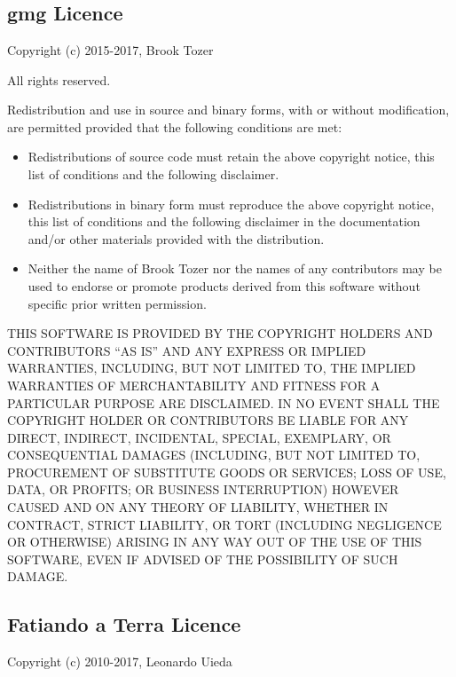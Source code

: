 \documentclass[a4paper,12pt,english]{sphinxmanual}
\begin{document}
\chapter{}
\label{\detokenize{licence::doc}}\label{\detokenize{licence:licencing}}\label{\detokenize{licence:licence}}

\section{gmg Licence}
\label{\detokenize{licence:gmg-licence}}
Copyright (c) 2015-2017, Brook Tozer

All rights reserved.

Redistribution and use in source and binary forms, with or without modification,
are permitted provided that the following conditions are met:
\begin{itemize}
\item {} 
Redistributions of source code must retain the above copyright notice,
this list of conditions and the following disclaimer.

\item {} 
Redistributions in binary form must reproduce the above copyright notice,
this list of conditions and the following disclaimer in the documentation
and/or other materials provided with the distribution.

\item {} 
Neither the name of Brook Tozer nor the names of any contributors
may be used to endorse or promote products derived from this software
without specific prior written permission.

\end{itemize}

THIS SOFTWARE IS PROVIDED BY THE COPYRIGHT HOLDERS AND CONTRIBUTORS “AS IS” AND
ANY EXPRESS OR IMPLIED WARRANTIES, INCLUDING, BUT NOT LIMITED TO, THE IMPLIED
WARRANTIES OF MERCHANTABILITY AND FITNESS FOR A PARTICULAR PURPOSE ARE
DISCLAIMED. IN NO EVENT SHALL THE COPYRIGHT HOLDER OR CONTRIBUTORS BE LIABLE FOR
ANY DIRECT, INDIRECT, INCIDENTAL, SPECIAL, EXEMPLARY, OR CONSEQUENTIAL DAMAGES
(INCLUDING, BUT NOT LIMITED TO, PROCUREMENT OF SUBSTITUTE GOODS OR SERVICES;
LOSS OF USE, DATA, OR PROFITS; OR BUSINESS INTERRUPTION) HOWEVER CAUSED AND ON
ANY THEORY OF LIABILITY, WHETHER IN CONTRACT, STRICT LIABILITY, OR TORT
(INCLUDING NEGLIGENCE OR OTHERWISE) ARISING IN ANY WAY OUT OF THE USE OF THIS
SOFTWARE, EVEN IF ADVISED OF THE POSSIBILITY OF SUCH DAMAGE.


\section{Fatiando a Terra Licence}
\label{\detokenize{licence:fatiando-a-terra-licence}}
Copyright (c) 2010-2017, Leonardo Uieda
\end{document}
